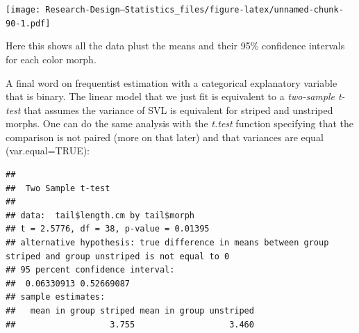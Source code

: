 \documentclass[
]{book}
\newenvironment{Shaded}{\begin{snugshade}}{\end{snugshade}}
\newcommand{\AttributeTok}[1]{\textcolor[rgb]{0.13,0.29,0.53}{#1}}
\newcommand{\ConstantTok}[1]{\textcolor[rgb]{0.56,0.35,0.01}{#1}}
\newcommand{\DecValTok}[1]{\textcolor[rgb]{0.00,0.00,0.81}{#1}}
\newcommand{\FloatTok}[1]{\textcolor[rgb]{0.00,0.00,0.81}{#1}}
\newcommand{\FunctionTok}[1]{\textcolor[rgb]{0.13,0.29,0.53}{\textbf{#1}}}
\newcommand{\NormalTok}[1]{#1}
\newcommand{\SpecialCharTok}[1]{\textcolor[rgb]{0.81,0.36,0.00}{\textbf{#1}}}
\begin{document}
\texttt{[image: Research-Design---Statistics\_files/figure-latex/unnamed-chunk-90-1.pdf]}

Here this shows all the data plust the means and their 95\% confidence intervals for each color morph.

A final word on frequentist estimation with a categorical explanatory variable that is binary. The linear model that we just fit is equivalent to a \emph{two-sample t-test} that assumes the variance of SVL is equivalent for striped and unstriped morphs. One can do the same analysis with the \emph{t.test} function specifying that the comparison is not paired (more on that later) and that variances are equal (var.equal=TRUE):

\begin{Shaded}
\end{Shaded}

\begin{verbatim}
## 
##  Two Sample t-test
## 
## data:  tail$length.cm by tail$morph
## t = 2.5776, df = 38, p-value = 0.01395
## alternative hypothesis: true difference in means between group striped and group unstriped is not equal to 0
## 95 percent confidence interval:
##  0.06330913 0.52669087
## sample estimates:
##   mean in group striped mean in group unstriped 
##                   3.755                   3.460
\end{verbatim}
\end{document}
